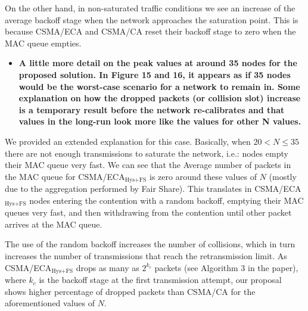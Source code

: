 \documentclass[]{article}
\begin{document}
		On the other hand, in non-saturated traffic conditions we see an increase of the average backoff stage when the network approaches the saturation point. This is because CSMA/ECA and CSMA/CA reset their backoff stage to zero when the MAC queue empties.

		
%		
		
		\begin{itemize}
			\item {\bf A little more detail on the peak values at around 35 nodes for the proposed solution. In Figure 15 and 16, it appears as if 35 nodes would be the worst-case scenario for a network to remain in. Some explanation on how the dropped packets (or collision slot) increase is a temporary result before the network re-calibrates and that values in the long-run look more like the values for other N values.}
		\end{itemize}
		
		We provided an extended explanation for this case. Basically, when $20 < N \leq 35$ there are not enough transmissions to saturate the network, i.e.: nodes empty their MAC queue very fast. We can see that the Average number of packets in the MAC queue for CSMA/ECA$_{\text{Hys+FS}}$ is zero around these values of $N$ (mostly due to the aggregation performed by Fair Share). This translates in CSMA/ECA$_{\text{Hys+FS}}$ nodes entering the contention with a random backoff, emptying their MAC queues very fast, and then withdrawing from the contention until other packet arrives at the MAC queue. 
		
		The use of the random backoff increases the number of collisions, which in turn increases the number of transmissions that reach the retransmission limit. As CSMA/ECA$_{\text{Hys+FS}}$ drops as many as $2^{k_{c}}$ packets (see Algorithm 3 in the paper), where $k_{c}$ is the backoff stage at the first transmission attempt, our proposal shows higher percentage of dropped packets than CSMA/CA for the aforementioned values of $N$.
		
\end{document}
